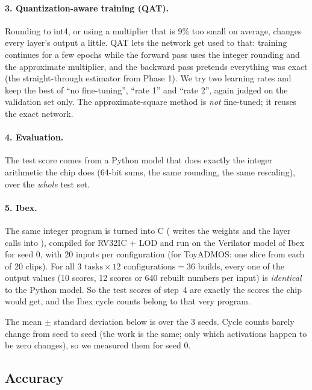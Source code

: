 \paragraph{3. Quantization-aware training (QAT).} Rounding to int4, or using a multiplier that is 9\% too small
on average, changes every layer's output a little. QAT lets the network get used to that: training continues
for a few epochs while the forward pass uses the integer rounding and the approximate multiplier, and the
backward pass pretends everything was exact (the straight-through estimator from Phase 1). We try two learning
rates and keep the best of ``no fine-tuning'', ``rate 1'' and ``rate 2'', again judged on the validation set
only. The approximate-square method is \emph{not} fine-tuned; it reuses the exact network.

\paragraph{4. Evaluation.} The test score comes from a Python model that does exactly the integer arithmetic the
chip does (64-bit sums, the same rounding, the same rescaling), over the \emph{whole} test set.

\paragraph{5. Ibex.} The same integer program is turned into C ( writes the weights and the
layer calls into ), compiled for RV32IC + LOD and run on the Verilator model of Ibex for seed 0,
with 20 inputs per configuration (for ToyADMOS: one slice from each of 20 clips). For all
$3 \text{ tasks} \times 12 \text{ configurations} = 36$ builds, every one of the output values (10 scores,
12 scores or 640 rebuilt numbers per input) is \emph{identical} to the Python model. So the test scores of step~4
are exactly the scores the chip would get, and the Ibex cycle counts belong to that very program.

\begin{careful}
The mean $\pm$ standard deviation below is over the 3 seeds. Cycle counts barely change from seed to seed (the
work is the same; only which activations happen to be zero changes), so we measured them for seed 0.
\end{careful}

\subsection{Accuracy}

